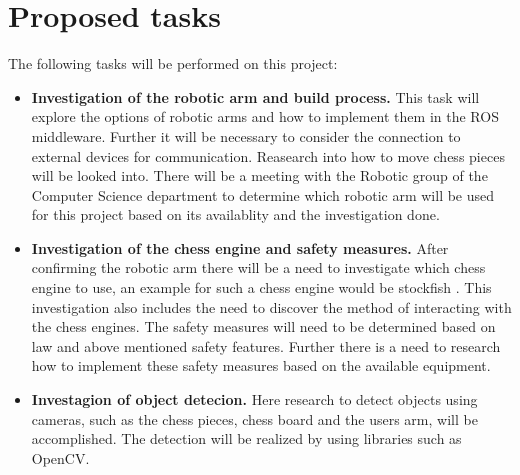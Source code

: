 \documentclass[11pt,fleqn,twoside]{article}
\begin{document}
\section{Proposed tasks}
The following tasks will be performed on this project:
\begin{itemize}
    \item \textbf{Investigation of the robotic arm and build process.} This task will explore the options
                  of robotic arms and how to implement them in the ROS middleware. Further it will be necessary 
                  to consider the connection to external devices for communication. Reasearch into how to move 
                  chess pieces will be looked into.\newline
                  There will be a meeting with the Robotic group of the Computer Science department to 
                  determine which robotic arm will be used for this project based on its availablity and the 
                  investigation done.\newpage

    \item \textbf{Investigation of the chess engine and safety measures.} After confirming the robotic arm there 
                  will be a need to investigate which chess engine to use, an example for such a chess engine would 
                  be stockfish \cite{stockfish}. This investigation also includes the need to discover the method of interacting with 
                  the chess engines.\newline
                  The safety measures will need to be determined based on law and above mentioned safety features. 
                  Further there is a need to research how to implement these safety measures based on the available 
                  equipment.

    \item \textbf{Investagion of object detecion.} Here research to detect objects using cameras, such as 
                  the chess pieces, chess board and the users arm, will be accomplished. The detection will be 
                  realized by using libraries such as OpenCV.
                  

\end{itemize}
\end{document}

